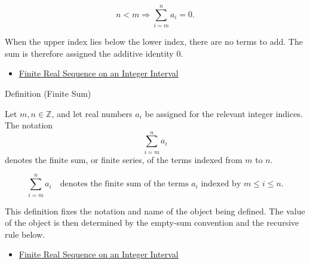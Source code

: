 \begin{remark*}
\[
  n<m\Longrightarrow \sum_{i=m}^{n}a_i=0.
\]
\end{remark*}

\begin{remark*}[Interpretation]
When the upper index lies below the lower index, there are no terms to
add. The sum is therefore assigned the additive identity \(0\).
\end{remark*}

\begin{dependencies}
\begin{itemize}
  \item \hyperref[def:finite-real-sequence-integer-interval]{Finite Real Sequence on an Integer Interval}
\end{itemize}
\end{dependencies}

\begin{definitionbox}{Definition (Finite Sum)}
\begin{definition}
\label{def:finite-sum}

Let \(m,n \in \mathbb{Z}\), and let real numbers \(a_i\) be assigned
for the relevant integer indices. The notation
\[
  \sum_{i=m}^{n} a_i
\]
denotes the finite sum, or finite series, of the terms indexed from
\(m\) to \(n\).
\end{definition}
\end{definitionbox}

\begin{remark*}
\[
  \sum_{i=m}^{n} a_i
  \quad\text{denotes the finite sum of the terms } a_i
  \text{ indexed by } m \le i \le n.
\]
\end{remark*}

\begin{remark*}[Interpretation]
This definition fixes the notation and name of the object being defined.
The value of the object is then determined by the empty-sum convention
and the recursive rule below.
\end{remark*}

\begin{dependencies}
\begin{itemize}
  \item \hyperref[def:finite-real-sequence-integer-interval]{Finite Real Sequence on an Integer Interval}
\end{itemize}
\end{dependencies}

